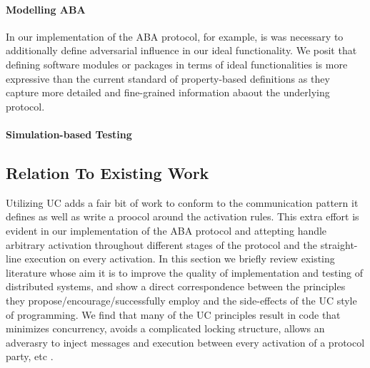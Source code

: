\paragraph{Modelling ABA}
In our implementation of the ABA protocol, for example, is was necessary to additionally define adversarial influence in our ideal functionality. 
We posit that defining software modules or packages in terms of ideal functionalities is more expressive than the current standard of property-based definitions as they capture more detailed and fine-grained information abaout the underlying protocol.


\paragraph{Simulation-based Testing}


\subsection{Relation To Existing Work}
Utilizing UC adds a fair bit of work to conform to the communication pattern it defines as well as write a proocol around the activation rules.
This extra effort is evident in our implementation of the ABA protocol and attepting handle arbitrary activation throughout different stages of the protocol and the straight-line execution on every activation.
In this section we briefly review existing literature whose aim it is to improve the quality of implementation and testing of distributed systems, and show a direct correspondence between the principles they propose/encourage/successfully employ and the side-effects of the UC style of programming.
We find that many of the UC principles result in code that minimizes concurrency, avoids a complicated locking structure, allows an adverasry to inject messages and execution between every activation of a protocol party, etc .





